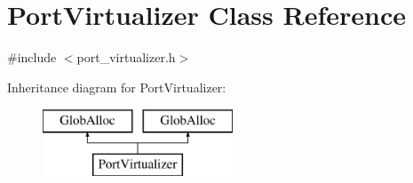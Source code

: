 \hypertarget{classPortVirtualizer}{\section{Port\-Virtualizer Class Reference}
\label{classPortVirtualizer}
}


{\ttfamily \#include $<$port\-\_\-virtualizer.\-h$>$}

Inheritance diagram for Port\-Virtualizer\-:\begin{figure}[H]
\begin{center}
\leavevmode
\includegraphics[height=2.000000cm]{classPortVirtualizer}
\end{center}
\end{figure}
